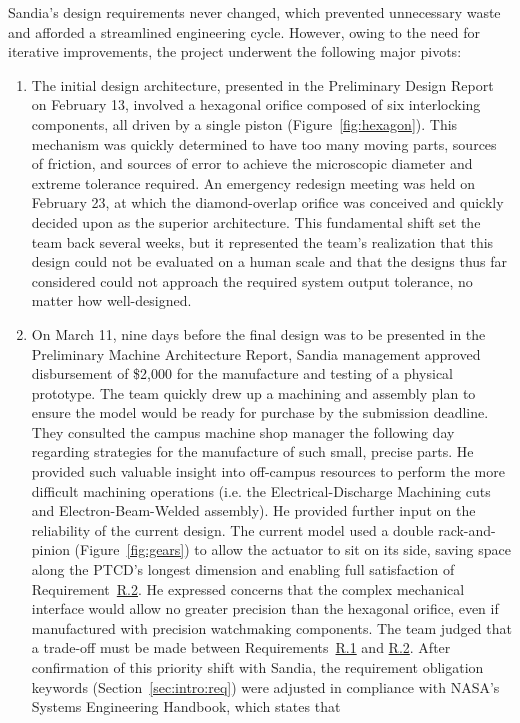 \documentclass[12pt, letterpaper]{report}%
\newcounter{mycounter}           %
\newcounter{sub}[mycounter]      %
\newcommand{\device}{PTCD}
\newcommand{\specref}[1]{\hyperref[tab:specs]{#1}}
\begin{document}
\begin{appendices}
	Sandia's design requirements never changed, which prevented unnecessary waste and afforded a streamlined engineering cycle. However, owing to the need for iterative improvements, the project underwent the following major pivots:

	\begin{enumerate}
		\item The initial design architecture, presented in the Preliminary Design Report on February 13, involved a hexagonal orifice composed of six interlocking components, all driven by a single piston (Figure~\ref{fig:hexagon}).
			This mechanism was quickly determined to have too many moving parts, sources of friction, and sources of error to achieve the microscopic diameter and extreme tolerance required.
			An emergency redesign meeting was held on February 23, at which the diamond-overlap orifice was conceived and quickly decided upon as the superior architecture.
			This fundamental shift set the team back several weeks, but it represented the team's realization that this design could not be evaluated on a human scale and that the designs thus far considered
			could not approach the required system output tolerance, no matter how well-designed.
		\item On March 11, nine days before the final design was to be presented in the Preliminary Machine Architecture Report, Sandia management approved disbursement of \$2,000 for the manufacture and testing of a physical prototype.        
			The team quickly drew up a machining and assembly plan to ensure the model would be ready for purchase by the submission deadline.
			They consulted the campus machine shop manager the following day regarding strategies for the manufacture of such small, precise parts. He provided such valuable insight into off-campus resources to perform the more difficult machining operations
			(i.e. the Electrical-Discharge Machining cuts and Electron-Beam-Welded assembly).
			He provided further input on the reliability of the current design. The current model used a double rack-and-pinion (Figure~\ref{fig:gears}) to allow the actuator to sit on its side, saving space along the \device's longest dimension and enabling full satisfaction of Requirement~\specref{R.2}.
			He expressed concerns that the complex mechanical interface would allow no greater precision than the hexagonal orifice, even if manufactured with precision watchmaking components.
			The team judged that a trade-off must be made between Requirements~\specref{R.1} and \specref{R.2}.
			After confirmation of this priority shift with Sandia, the requirement obligation keywords (Section~\ref{sec:intro:req}) were adjusted in compliance with NASA's Systems Engineering Handbook\cite[p.~54]{ref_NASA_specs_guide}, which states that

\end{enumerate}
\end{appendices}
\end{document}
